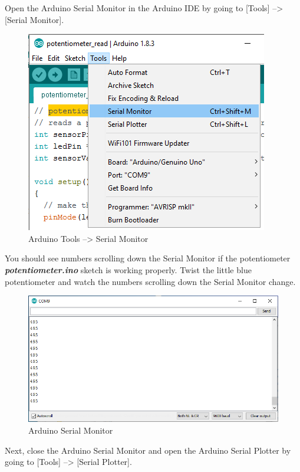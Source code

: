 \documentclass[11pt]{article}
\begin{document}
Open the Arduino Serial Monitor in the Arduino IDE by going to
{[}Tools{]} --\textgreater{} {[}Serial Monitor{]}.

\begin{figure}
\centering
\includegraphics{images/Tools_SerialMonitor.png}
\caption{Arduino Tools --\textgreater{} Serial Monitor}
\end{figure}

You should see numbers scrolling down the Serial Monitor if the
potentiometer \textbf{\emph{potentiometer.ino}} sketch is working
properly. Twist the little blue potentiometer and watch the numbers
scrolling down the Serial Monitor change.

\begin{figure}
\centering
\includegraphics{images/serial_monitor_output.png}
\caption{Arduino Serial Monitor}
\end{figure}

Next, close the Arduino Serial Monitor and open the Arduino Serial
Plotter by going to {[}Tools{]} --\textgreater{} {[}Serial Plotter{]}.
\end{document}
